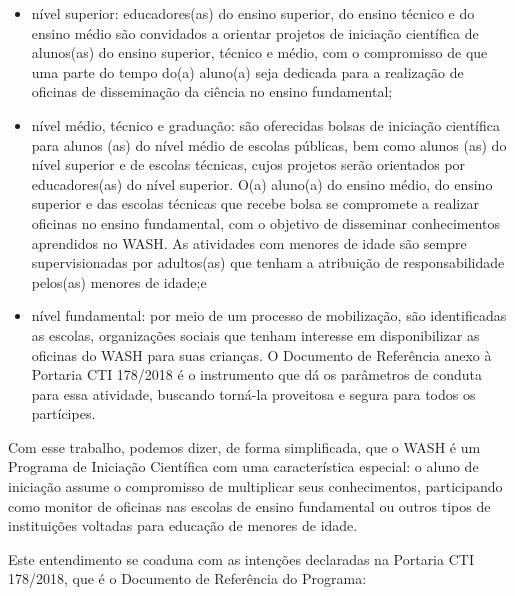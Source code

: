 \begin{itemize}
\item nível superior: educadores(as) do ensino superior, do ensino técnico e do ensino médio são convidados a orientar projetos de iniciação científica de alunos(as) do ensino superior, técnico e médio, com o compromisso de que uma parte do tempo do(a) aluno(a) seja dedicada para a realização de oficinas de disseminação da ciência no ensino fundamental;
\item nível médio, técnico e graduação: são oferecidas bolsas de iniciação científica para alunos (as) do nível médio de escolas públicas, bem como alunos (as) do nível superior e de escolas técnicas, cujos projetos serão orientados por educadores(as) do nível superior. O(a) aluno(a) do ensino médio, do ensino superior e das escolas técnicas que recebe bolsa se compromete a realizar oficinas no ensino fundamental, com o objetivo de disseminar conhecimentos aprendidos no WASH. As atividades com menores de idade são sempre supervisionadas por adultos(as) que tenham a  atribuição de responsabilidade pelos(as) menores de idade;e
\item nível fundamental: por meio de um processo de mobilização, são identificadas as escolas, organizações sociais que tenham interesse em disponibilizar as oficinas do WASH para suas crianças. O Documento de Referência anexo à Portaria CTI 178/2018 é o instrumento que dá os parâmetros de conduta para essa atividade, buscando torná-la proveitosa e segura para todos os partícipes.

\end{itemize}

Com esse trabalho, podemos dizer, de forma simplificada, que o WASH é um Programa de Iniciação Científica com uma característica especial: o aluno de iniciação assume o compromisso de multiplicar seus conhecimentos, participando como monitor de oficinas nas escolas de ensino fundamental ou outros tipos de instituições voltadas para educação de menores de idade.

Este entendimento se coaduna com as intenções declaradas na Portaria CTI 178/2018, que é o Documento de Referência do Programa:


\noindent\begin{center}\mbox{\centering{}}\end{center}


